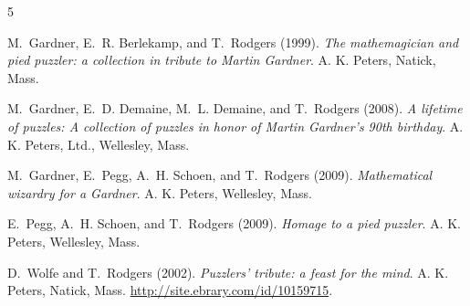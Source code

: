 \documentclass{amsbook}
\begin{document}
\begin{thebibliography}{5}

M.~Gardner, E.~R. Berlekamp, and T.~Rodgers (1999).
\emph{The mathemagician and pied puzzler: a collection in tribute to
  Martin Gardner}.
A. K. Peters, Natick, Mass.

M.~Gardner, E.~D. Demaine, M.~L. Demaine, and T.~Rodgers (2008).
\emph{A lifetime of puzzles: {A} collection of puzzles in honor of
  Martin Gardner's 90th birthday}.
A. K. Peters, Ltd., Wellesley, Mass.

M.~Gardner, E.~Pegg, A.~H. Schoen, and T.~Rodgers (2009).
\emph{Mathematical wizardry for a Gardner}.
A. K. Peters, Wellesley, Mass.

E.~Pegg, A.~H. Schoen, and T.~Rodgers (2009).
\emph{Homage to a pied puzzler}.
A. K. Peters, Wellesley, Mass.

D.~Wolfe and T.~Rodgers (2002).
\emph{Puzzlers' tribute: a feast for the mind}.
A. K. Peters, Natick, Mass.
\url{http://site.ebrary.com/id/10159715}.

\end{thebibliography}
\end{document}
